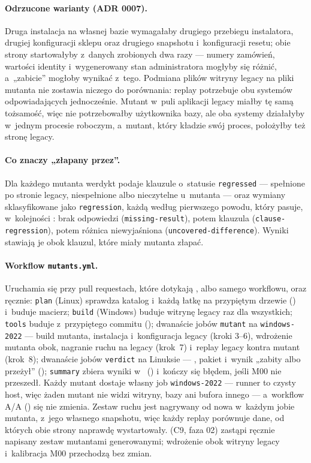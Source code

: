 \paragraph{Odrzucone warianty (ADR 0007).} Druga instalacja na własnej bazie wymagałaby
drugiego przebiegu instalatora, drugiej konfiguracji sklepu oraz drugiego snapshotu
i~konfiguracji resetu; obie strony startowałyby z~danych zrobionych dwa razy --- numery
zamówień, wartości identity i~wygenerowany stan administratora mogłyby się różnić,
a~„zabicie” mogłoby wynikać z~tego. Podmiana plików witryny legacy na pliki mutanta nie
zostawia niczego do porównania: replay potrzebuje obu systemów odpowiadających jednocześnie.
Mutant w~puli aplikacji legacy miałby tę samą tożsamość, więc nie potrzebowałby użytkownika
bazy, ale oba systemy działałyby w~jednym procesie roboczym, a~mutant, który kładzie swój
proces, położyłby też stronę legacy.

\paragraph{Co znaczy „złapany przez”.} Dla każdego mutanta werdykt podaje klauzule o~statusie
\texttt{regressed} --- spełnione po stronie legacy, niespełnione albo nieczytelne u~mutanta
--- oraz wymiany sklasyfikowane jako \texttt{regression}, każdą według pierwszego powodu,
który pasuje, w~kolejności : brak odpowiedzi (\texttt{missing-result}), potem
klauzula (\texttt{clause-regression}), potem różnica niewyjaśniona
(\texttt{uncovered-difference}). Wyniki stawiają je obok klauzul, które miały mutanta
złapać.

\paragraph{Workflow \texttt{mutants.yml}.} Uruchamia się przy pull requestach, które
dotykają ,  albo samego workflowu, oraz ręcznie:
\texttt{plan} (Linux) sprawdza katalog i~każdą łatkę na przypiętym drzewie
() i~buduje macierz; \texttt{build} (Windows) buduje witrynę
legacy raz dla wszystkich; \texttt{tools} buduje  z~przypiętego commitu
(); dwanaście jobów \texttt{mutant} na \texttt{windows-2022} ---
build mutanta, instalacja i~konfiguracja legacy (kroki 3--6), wdrożenie mutanta obok,
nagranie ruchu na legacy (krok~7) i~replay legacy kontra mutant (krok~8); dwanaście jobów
\texttt{verdict} na Linuksie --- , pakiet i~wynik „zabity albo
przeżył” (); \texttt{summary} zbiera wyniki w~
() i~kończy się błędem, jeśli M00 nie przeszedł. Każdy mutant
dostaje własny job \texttt{windows-2022} --- runner to czysty host, więc żaden mutant nie
widzi witryny, bazy ani bufora innego --- a~workflow A/A () się nie
zmienia. Zestaw ruchu jest nagrywany od nowa w~każdym jobie mutanta, z~jego własnego
snapshotu, więc każdy replay porównuje dane, od których obie strony naprawdę wystartowały.
 (C9, faza 02) zastąpi ręcznie napisany zestaw mutantami generowanymi;
wdrożenie obok witryny legacy i~kalibracja M00 przechodzą bez zmian.

